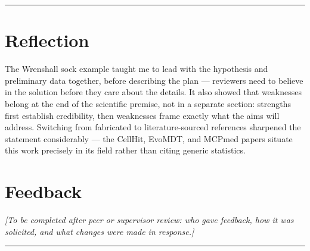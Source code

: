 \documentclass[12pt, letterpaper]{article}
\begin{document}
\hrule
\vspace{0.5em}

\section{Reflection}

The Wrenshall sock example taught me to lead with the hypothesis and preliminary data together,
before describing the plan --- reviewers need to believe in the solution before they care about the
details. It also showed that weaknesses belong at the end of the scientific premise, not in a
separate section: strengths first establish credibility, then weaknesses frame exactly what the
aims will address. Switching from fabricated to literature-sourced references sharpened the
statement considerably --- the CellHit, EvoMDT, and MCPmed papers situate this work precisely in
its field rather than citing generic statistics.

\section{Feedback}

\textit{[To be completed after peer or supervisor review: who gave feedback, how it was solicited,
and what changes were made in response.]}

\vspace{0.8em}
\hrule
\vspace{0.5em}
\end{document}
